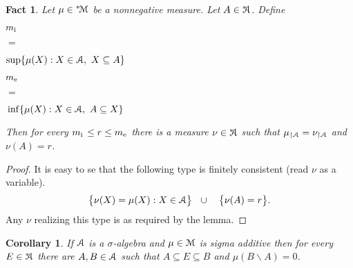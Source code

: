 \documentclass[12pt,letterpaper,oneside,reqno]{amsart}
\theoremstyle{plain}
\newtheorem{fact}[theorem]{Fact}
\newtheorem{corollary}[theorem]{Corollary}
\theoremstyle{remark}
\renewcommand*{\emph}[1]{%
   \smash{\tikz[baseline]\node[rectangle, fill=olive!25, rounded corners, inner xsep=0.5ex, inner ysep=0.2ex, anchor=base, minimum height = 2.7ex]{#1};}}
\begin{document}
\def\ceq#1#2#3{\parbox[t]{25ex}{$\displaystyle #1$}\parbox{5ex}{\hfil $#2$}{$\displaystyle #3$}}

\begin{fact}
  Let $\mu\in{}^{*\!}{\EuScript M}$ be a nonnegative measure.
  Let $A\in{}^{*\!\!\!}{\EuScript A}$.
  Define 
  
  \ceq{\hfill m_{\rm i\,}}{=}{\sup\{\mu(X): X\in{\EuScript A},\ X\subseteq A\}}

  \ceq{\hfill m_{\rm e}}{=}{\,\inf\{\mu(X): X\in{\EuScript A}, \  A\subseteq X \}}

  Then for every $m_{\rm i\,}\le r\le m_{\rm e}$ there is a measure $\nu\in{}^{*\!\!\!}{\EuScript A}$ such that $\mu_{\restriction{\EuScript A}}=\nu_{\restriction{\EuScript A}}$ and  $\nu(A)=r$.
\end{fact}


\begin{proof}

It is easy to se that the following type is finitely consistent (read $\nu$ as a variable).
$$
\big\{\nu(X)
=
\mu(X) : X\in{\EuScript A}\big\}
\ \ \cup\ \ \
\big\{\nu(A)=r\big\}.
$$
Any $\nu$ realizing this type is as required by the lemma.
\end{proof}

\begin{corollary}
  If ${\EuScript A}$ is a $\sigma$-algebra and $\mu\in{\EuScript M}$ is sigma additive then for every $E\in{}^{*\!\!\!}{\EuScript A}$ there are $A,B\in{\EuScript A}$ such that $A\subseteq E\subseteq B$ and $\mu(B\smallsetminus A)=0$.
\end{corollary}






\end{document}
